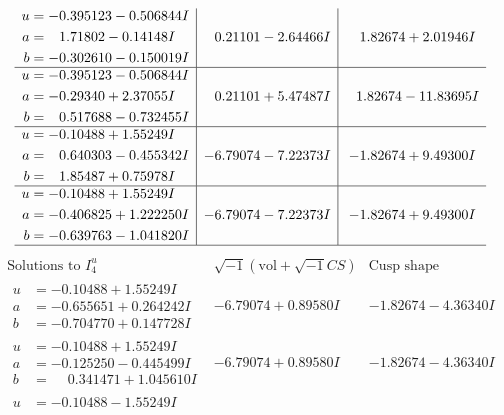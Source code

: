 \documentclass[1p]{elsarticle_modified}
\theoremstyle{definition}
\newcommand{\I}{\sqrt{-1}}
\begin{document}
$$\begin{array}{c|c|c}
\begin{aligned}
u &= -0.395123 - 0.506844 I \\
a &= \phantom{-}1.71802 - 0.14148 I \\
b &= -0.302610 - 0.150019 I\end{aligned}
 & \phantom{-}0.21101 - 2.64466 I & \phantom{-}1.82674 + 2.01946 I \\ \hline\begin{aligned}
u &= -0.395123 - 0.506844 I \\
a &= -0.29340 + 2.37055 I \\
b &= \phantom{-}0.517688 - 0.732455 I\end{aligned}
 & \phantom{-}0.21101 + 5.47487 I & \phantom{-}1.82674 - 11.83695 I \\ \hline\begin{aligned}
u &= -0.10488 + 1.55249 I \\
a &= \phantom{-}0.640303 - 0.455342 I \\
b &= \phantom{-}1.85487 + 0.75978 I\end{aligned}
 & -6.79074 - 7.22373 I & -1.82674 + 9.49300 I \\ \hline\begin{aligned}
u &= -0.10488 + 1.55249 I \\
a &= -0.406825 + 1.222250 I \\
b &= -0.639763 - 1.041820 I\end{aligned}
 & -6.79074 - 7.22373 I & -1.82674 + 9.49300 I\\
 \hline 
 \end{array}$$\newpage$$\begin{array}{c|c|c}  
\text{Solutions to }I^u_{4}& \I (\text{vol} + \sqrt{-1}CS) & \text{Cusp shape}\\
 \hline 
\begin{aligned}
u &= -0.10488 + 1.55249 I \\
a &= -0.655651 + 0.264242 I \\
b &= -0.704770 + 0.147728 I\end{aligned}
 & -6.79074 + 0.89580 I & -1.82674 - 4.36340 I \\ \hline\begin{aligned}
u &= -0.10488 + 1.55249 I \\
a &= -0.125250 - 0.445499 I \\
b &= \phantom{-}0.341471 + 1.045610 I\end{aligned}
 & -6.79074 + 0.89580 I & -1.82674 - 4.36340 I \\ \hline\begin{aligned}
u &= -0.10488 - 1.55249 I \\

\end{aligned}
\end{array}$$
\end{document}
